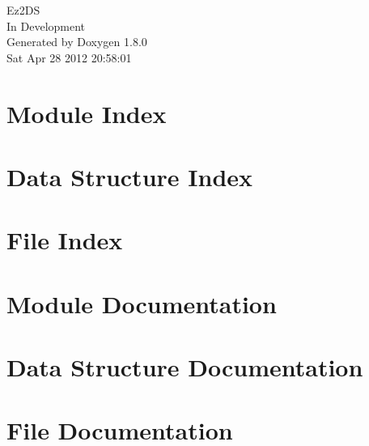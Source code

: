 \documentclass{book}
\begin{document}
\hypersetup{pageanchor=false,citecolor=blue}
\begin{titlepage}
\vspace*{7cm}
\begin{center}
{\Large Ez2\-D\-S \\[1ex]\large In Development }\\
\vspace*{1cm}
{\large Generated by Doxygen 1.8.0}\\
\vspace*{0.5cm}
{\small Sat Apr 28 2012 20:58:01}\\
\end{center}
\end{titlepage}
\clearemptydoublepage
{}
\tableofcontents
\clearemptydoublepage
{}
\hypersetup{pageanchor=true,citecolor=blue}
\chapter{Module Index}

\chapter{Data Structure Index}

\chapter{File Index}

\chapter{Module Documentation}







\chapter{Data Structure Documentation}












\chapter{File Documentation}








\printindex
\end{document}
